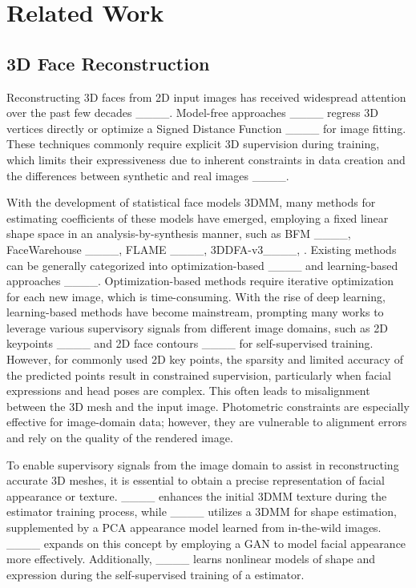 \section{Related Work}
\subsection{3D Face Reconstruction}
Reconstructing 3D faces from 2D input images has received widespread attention over the past few decades ____.
Model-free approaches ____ regress 3D vertices directly or optimize a Signed Distance Function ____ for image fitting.
These techniques commonly require explicit 3D supervision during training, which limits their expressiveness due to inherent constraints in data creation and the differences between synthetic and real images ____.

With the development of statistical face models 3DMM, many methods for estimating coefficients of these models have emerged, employing a fixed linear shape space in an analysis-by-synthesis manner, such as BFM ____, FaceWarehouse ____, FLAME ____, 3DDFA-v3____, \etc. Existing methods can be generally categorized into optimization-based ____ and learning-based approaches ____.
Optimization-based methods require iterative optimization for each new image, which is time-consuming. With the rise of deep learning, learning-based methods have become mainstream, prompting many works to leverage various supervisory signals from different image domains, such as 2D keypoints ____ and 2D face contours ____ for self-supervised training. However, for commonly used 2D key points, the sparsity and limited accuracy of the predicted points result in constrained supervision, particularly when facial expressions and head poses are complex. This often leads to misalignment between the 3D mesh and the input image. Photometric constraints are especially effective for image-domain data; however, they are vulnerable to alignment errors and rely on the quality of the rendered image.

To enable supervisory signals from the image domain to assist in reconstructing accurate 3D meshes, it is essential to obtain a precise representation of facial appearance or texture. ____ enhances the initial 3DMM texture during the estimator training process, while ____ utilizes a 3DMM for shape estimation, supplemented by a PCA appearance model learned from in-the-wild images. ____ expands on this concept by employing a GAN to model facial appearance more effectively. Additionally, ____ learns nonlinear models of shape and expression during the self-supervised training of a estimator.

